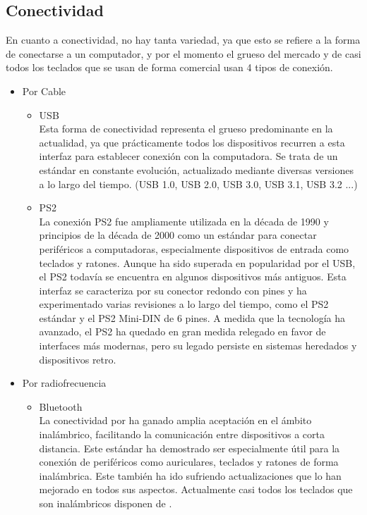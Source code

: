 \subsection{Conectividad}
En cuanto a conectividad, no hay tanta variedad, ya que esto se refiere a la forma de conectarse a un computador, y por el momento el grueso del mercado y de casi todos los teclados que se usan de forma comercial usan 4 tipos de conexión. 
\newpage
\begin{itemize}
    \item Por Cable \cite{Keyboards-connection-types-wired}
    \begin{itemize}
        \item \gls{USB} \\
            Esta forma de conectividad representa el grueso predominante en la actualidad, ya que prácticamente todos los dispositivos recurren a esta interfaz para establecer conexión con la computadora. Se trata de un estándar en constante evolución, actualizado mediante diversas versiones a lo largo del tiempo.  (\gls{USB} 1.0, \gls{USB} 2.0, \gls{USB} 3.0, \gls{USB} 3.1, \gls{USB} 3.2 ...)
        \item \gls{PS2} \\
            La conexión \gls{PS2} fue ampliamente utilizada en la década de 1990 y principios de la década de 2000 como un estándar para conectar periféricos a computadoras, especialmente dispositivos de entrada como teclados y ratones. Aunque ha sido superada en popularidad por el \gls{USB}, el \gls{PS2} todavía se encuentra en algunos dispositivos más antiguos. Esta interfaz se caracteriza por su conector redondo con pines y ha experimentado varias revisiones a lo largo del tiempo, como el \gls{PS2} estándar y el \gls{PS2} Mini-DIN de 6 pines. A medida que la tecnología ha avanzado, el \gls{PS2} ha quedado en gran medida relegado en favor de interfaces más modernas, pero su legado persiste en sistemas heredados y dispositivos retro. 
    \end{itemize}
    \item Por radiofrecuencia \cite{Keyboards-connection-types-wireless}
    \begin{itemize}
        \item \gls{Bluetooth} \\
            La conectividad por  ha ganado amplia aceptación en el ámbito inalámbrico, facilitando la comunicación entre dispositivos a corta distancia. Este estándar ha demostrado ser especialmente útil para la conexión de periféricos como auriculares, teclados y ratones de forma inalámbrica. Este también ha ido sufriendo actualizaciones que lo han mejorado en todos sus aspectos. Actualmente casi todos los teclados que son inalámbricos disponen de .
    

\end{itemize}
\end{itemize}
